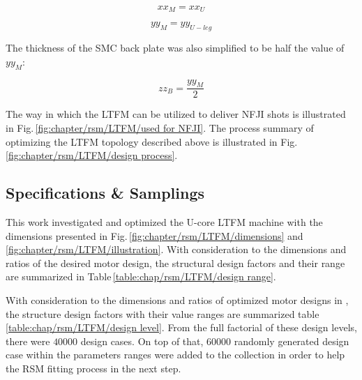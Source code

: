         
        \begin{equation}
            xx_M=xx_U
            \label{eq:chap/rsm/LTFM/xm is xu}
        \end{equation}
        
        
        \begin{equation}
            yy_M=yy_{U-leg}
            \label{eq:chap/rsm/LTFM/ym is yuleg}
        \end{equation}
        
        
        The thickness of the \acs{SMC} back plate was also simplified to be half the value of $yy_{M}$:
        
        
        \begin{equation}
            zz_B=\frac{yy_M}{2}
            \label{eq:chap/rsm/LTFM/zb is half of ym}
        \end{equation}
        
        
        The way in which the \acs{LTFM} can be utilized to deliver \acs{NFJI} shots is illustrated in Fig.\,\ref{fig:chapter/rsm/LTFM/used for NFJI}. The process summary of optimizing the \acs{LTFM} topology described above is illustrated in Fig.\,\ref{fig:chapter/rsm/LTFM/design process}.
        

        \subsection{Specifications \& Samplings}    \label{Chapter:RSM/LTFM/spec}
        
            
            This work investigated and optimized the U-core \acs{LTFM} machine with the dimensions presented in Fig.\,\ref{fig:chapter/rsm/LTFM/dimensions} and \ref{fig:chapter/rsm/LTFM/illustration}. With consideration to the dimensions and ratios of the desired motor design, the structural design factors and their range are summarized in Table\,\ref{table:chap/rsm/LTFM/design range}. 
            
            
            With consideration to the dimensions and ratios of optimized motor designs in \cite{Kremers2015}, the structure design factors with their value ranges are summarized table\,\ref{table:chap/rsm/LTFM/design level}. From the full factorial of these design levels, there were $40000$ design cases. On top of that, $60000$ randomly generated design case within the parameters ranges were added to the collection in order to help the \acs{RSM} fitting process in the next step.
            
